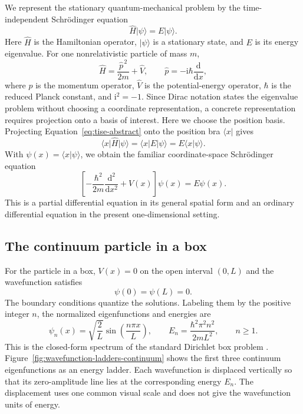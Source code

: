 \documentclass[11pt]{article}
\begin{document}
We represent the stationary quantum-mechanical problem by the time-independent
Schr\"odinger equation
\begin{equation}
 \widehat H\lvert\psi\rangle=E\lvert\psi\rangle.
 \label{eq:tise-abstract}
\end{equation}
Here $\widehat H$ is the Hamiltonian operator, $\lvert\psi\rangle$ is a stationary
state, and $E$ is its energy eigenvalue. For one nonrelativistic particle of mass
$m$,
\begin{equation}
 \widehat H=\frac{\widehat p^{\,2}}{2m}+\widehat V,
 \qquad
 \widehat p=-\mathrm{i}\hbar\frac{\mathrm{d}}{\mathrm{d}x},
 \label{eq:abstract-hamiltonian}
\end{equation}
where $\widehat p$ is the momentum operator, $\widehat V$ is the potential-energy
operator, $\hbar$ is the reduced Planck constant, and $\mathrm{i}^2=-1$. Since Dirac
notation states the eigenvalue problem without choosing a coordinate representation,
a concrete representation requires projection onto a basis of interest. Here we
choose the position basis. Projecting Equation~\eqref{eq:tise-abstract} onto the
position bra $\langle x\rvert$ gives
\begin{equation}
 \langle x\rvert\widehat H\lvert\psi\rangle
 =\langle x\rvert E\lvert\psi\rangle
 =E\langle x\vert\psi\rangle.
 \label{eq:tise-position-projection}
\end{equation}
With $\psi(x)=\langle x\vert\psi\rangle$, we obtain the familiar coordinate-space
Schr\"odinger equation
\begin{equation}
 \left[-\frac{\hbar^2}{2m}
 \frac{\mathrm{d}^2}{\mathrm{d}x^2}+V(x)\right]\psi(x)
 =E\psi(x).
 \label{eq:tise-position}
\end{equation}
This is a partial differential equation in its general spatial form and an ordinary
differential equation in the present one-dimensional setting.

\subsection{The continuum particle in a box}

For the particle in a box, $V(x)=0$ on the open interval $(0,L)$ and the wavefunction
satisfies
\begin{equation}
 \psi(0)=\psi(L)=0.
 \label{eq:dirichlet-boundary}
\end{equation}
The boundary conditions quantize the solutions. Labeling them by the positive integer
$n$, the normalized eigenfunctions and energies are
\begin{equation}
 \psi_n(x)=\sqrt{\frac{2}{L}}\sin\!\left(\frac{n\pi x}{L}\right),
 \qquad
 E_n=\frac{\hbar^2\pi^2n^2}{2mL^2},
 \qquad n\geq 1.
 \label{eq:continuum-spectrum}
\end{equation}
This is the closed-form spectrum of the standard Dirichlet box problem
\cite{teschl2014}. Figure~\ref{fig:wavefunction-ladders-continuum} shows the first
three continuum eigenfunctions as an energy ladder. Each wavefunction is displaced
vertically so that its zero-amplitude line lies at the corresponding energy $E_n$.
The displacement uses one common visual scale and does not give the wavefunction units
of energy.
\end{document}

